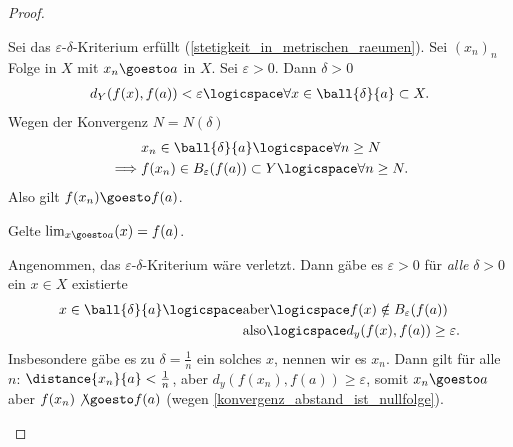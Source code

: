 \begin{proof}
    \begin{proofdescription}
        
        \item[\hin] Sei das \( \varepsilon \)-\( \delta \)-Kriterium erfüllt (\ref{stetigkeit_in_metrischen_raeumen}).
        Sei \( (x_n)_n \) Folge in \( X \) mit \( x_n\goesto a \) in \( X \). Sei \( \varepsilon>0 \). Dann \texists \( \delta>0 \) \sd
        \begin{align*}
            d_Y(f(x),f(a))<\varepsilon\logicspace\forall x\in \ball{\delta}{a}\subset X.
        \end{align*} 
        Wegen der Konvergenz \texists \( N=N(\delta) \) \sd
        \begin{align*}
            &x_n\in \ball{\delta}{a} \logicspace\forall n\geq N\\
            \implies &f(x_n)\in B_\varepsilon(f(a))\subset Y \logicspace \forall n\geq N.
        \end{align*}
        Also gilt \( f(x_n)\goesto f(a) \).
        \item[\rueck] Gelte \( \lim_{x \goesto a} (x)=f(a) \).
        
        Angenommen, das \( \varepsilon \)-\( \delta \)-Kriterium wäre verletzt. Dann gäbe es \( \varepsilon>0 \) \sd für \emph{alle} \( \delta>0 \) ein \( x\in X \) existierte \sd
        \begin{align*}
            x\in \ball{\delta}{a}\logicspace \begin{aligned}[t] 
                &\text{aber} \logicspace f(x)\notin B_\varepsilon(f(a))\\
                &\text{also} \logicspace d_y(f(x), f(a)) \geq \varepsilon.
            \end{aligned}
        \end{align*}
        Insbesondere gäbe es zu \( \delta=\frac{1}{n} \) ein solches \( x \), nennen wir es \( x_n \). Dann gilt für alle \( n \): \( \distance{x_n}{a}<\frac{1}{n} \), aber \( d_y(f(x_n),f(a))\geq \varepsilon \), somit \( x_n\goesto a \) aber \( f(x_n)\not\goesto f(a) \) (wegen \ref{konvergenz_abstand_ist_nullfolge}).
    \end{proofdescription}
    
    
\end{proof}
